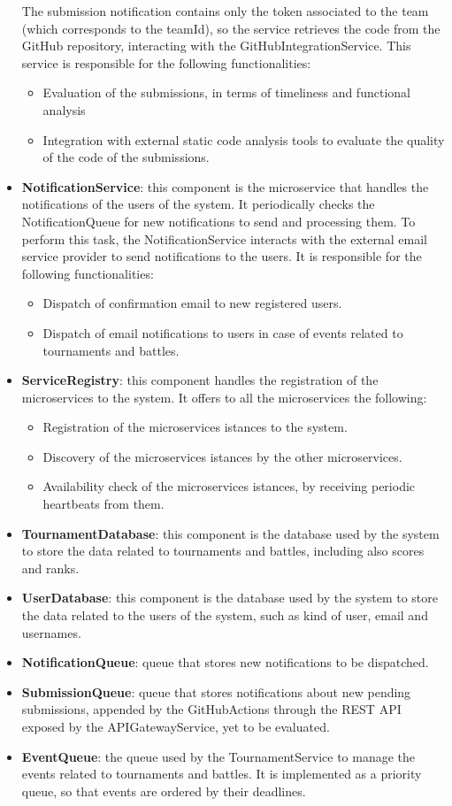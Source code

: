 \begin{itemize}
     The submission notification contains only the token associated to the team (which corresponds to the teamId), so the service retrieves the code from the GitHub repository, interacting with the GitHubIntegrationService.
     This service is responsible for the following functionalities:
    \begin{itemize}
        \item Evaluation of the submissions, in terms of timeliness and functional analysis 
        \item Integration with external static code analysis tools to evaluate the quality of the code of the submissions.
    \end{itemize}
    \item \textbf{NotificationService}: this component is the microservice that handles the notifications of the users of the system. It periodically checks the NotificationQueue for new notifications to send and processing them. To perform this task, the NotificationService interacts with the external email service provider to send notifications to the users.
     It is responsible for the following functionalities:
    \begin{itemize}
        \item Dispatch of confirmation email to new registered users.
        \item Dispatch of email notifications to users in case of events related to tournaments and battles.
    \end{itemize}
    \item \textbf{ServiceRegistry}: this component handles the registration of the microservices to the system. It offers to all the microservices the following:
    \begin{itemize}
        \item Registration of the microservices istances to the system.
        \item Discovery of the microservices istances by the other microservices.
        \item Availability check of the microservices istances, by receiving periodic heartbeats from them.
    \end{itemize}
    \item \textbf{TournamentDatabase}: this component is the database used by the system to store the data related to tournaments and battles, including also scores and ranks.
    \item \textbf{UserDatabase}: this component is the database used by the system to store the data related to the users of the system, such as kind of user, email and usernames.
    \item \textbf{NotificationQueue}: queue that stores new notifications to be dispatched.
    \item \textbf{SubmissionQueue}: queue that stores notifications about new pending submissions, appended by the GitHubActions through the REST API exposed by the APIGatewayService, yet to be evaluated.
    \item \textbf{EventQueue}: the queue used by the TournamentService to manage the events related to tournaments and battles. It is implemented as a priority queue, so that events are ordered by their deadlines.
\end{itemize}
